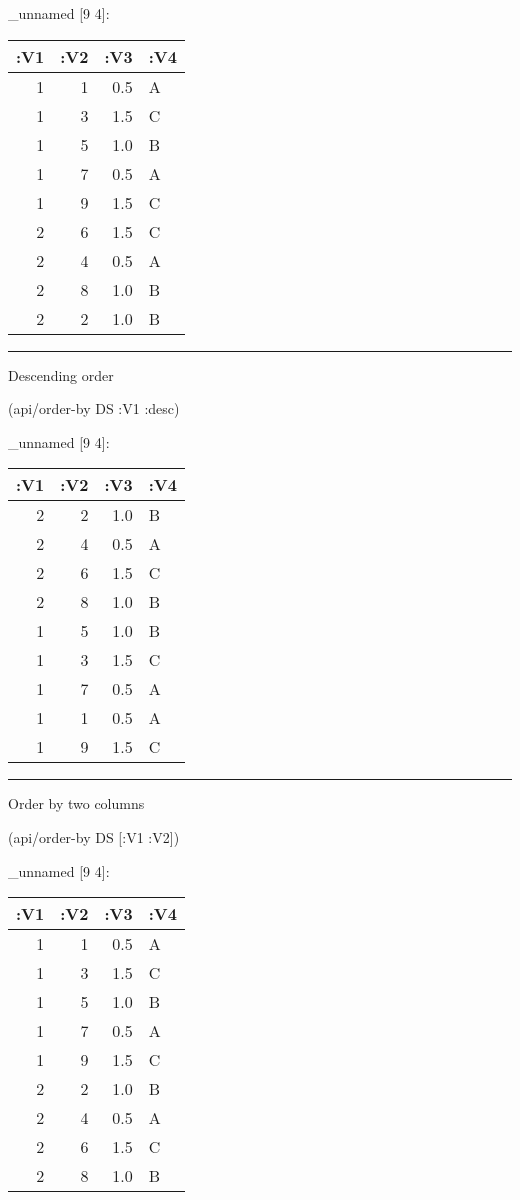 \documentclass[]{article}
\newenvironment{Shaded}{\begin{snugshade}}{\end{snugshade}}
\newcommand{\AttributeTok}[1]{\textcolor[rgb]{0.77,0.63,0.00}{#1}}
\newcommand{\NormalTok}[1]{#1}
\begin{document}
\_unnamed {[}9 4{]}:

\begin{longtable}[]{@{}rrrl@{}}
\toprule
:V1 & :V2 & :V3 & :V4\tabularnewline
\midrule
\endhead
1 & 1 & 0.5 & A\tabularnewline
1 & 3 & 1.5 & C\tabularnewline
1 & 5 & 1.0 & B\tabularnewline
1 & 7 & 0.5 & A\tabularnewline
1 & 9 & 1.5 & C\tabularnewline
2 & 6 & 1.5 & C\tabularnewline
2 & 4 & 0.5 & A\tabularnewline
2 & 8 & 1.0 & B\tabularnewline
2 & 2 & 1.0 & B\tabularnewline
\bottomrule
\end{longtable}

\begin{center}\rule{0.5\linewidth}{0.5pt}\end{center}

Descending order

\begin{Shaded}
\begin{Highlighting}[]
\NormalTok{(api/order-by DS }\AttributeTok{:V1} \AttributeTok{:desc}\NormalTok{)}
\end{Highlighting}
\end{Shaded}

\_unnamed {[}9 4{]}:

\begin{longtable}[]{@{}rrrl@{}}
\toprule
:V1 & :V2 & :V3 & :V4\tabularnewline
\midrule
\endhead
2 & 2 & 1.0 & B\tabularnewline
2 & 4 & 0.5 & A\tabularnewline
2 & 6 & 1.5 & C\tabularnewline
2 & 8 & 1.0 & B\tabularnewline
1 & 5 & 1.0 & B\tabularnewline
1 & 3 & 1.5 & C\tabularnewline
1 & 7 & 0.5 & A\tabularnewline
1 & 1 & 0.5 & A\tabularnewline
1 & 9 & 1.5 & C\tabularnewline
\bottomrule
\end{longtable}

\begin{center}\rule{0.5\linewidth}{0.5pt}\end{center}

Order by two columns

\begin{Shaded}
\begin{Highlighting}[]
\NormalTok{(api/order-by DS [}\AttributeTok{:V1} \AttributeTok{:V2}\NormalTok{])}
\end{Highlighting}
\end{Shaded}

\_unnamed {[}9 4{]}:

\begin{longtable}[]{@{}rrrl@{}}
\toprule
:V1 & :V2 & :V3 & :V4\tabularnewline
\midrule
\endhead
1 & 1 & 0.5 & A\tabularnewline
1 & 3 & 1.5 & C\tabularnewline
1 & 5 & 1.0 & B\tabularnewline
1 & 7 & 0.5 & A\tabularnewline
1 & 9 & 1.5 & C\tabularnewline
2 & 2 & 1.0 & B\tabularnewline
2 & 4 & 0.5 & A\tabularnewline
2 & 6 & 1.5 & C\tabularnewline
2 & 8 & 1.0 & B\tabularnewline
\bottomrule
\end{longtable}
\end{document}
